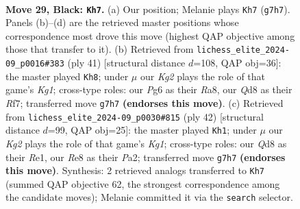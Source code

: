 \documentclass[11pt]{article}
\begin{document}
\clearpage

\begin{figure}[p]\centering
\begin{subfigure}{0.46\textwidth}\centering
\resizebox{\linewidth}{!}{%
\newchessgame
\chessboard[
  setfen={r2qr3/ppp3k1/3b1ppB/3b3p/PR6/2N3P1/RPP1QP1P/6K1 b - - 1 29},
  showmover=false,
  pgfstyle=straightmove, color=movearrow, markmove={g7-h7}
]}
\caption{}
\end{subfigure}\hfill
\begin{subfigure}{0.46\textwidth}\centering
\resizebox{\linewidth}{!}{%
\newchessgame
\chessboard[
  setfen={r2q2k1/p4r2/2p1b1Q1/3pp3/4Pb2/1PP4P/P2N1PP1/R3R1K1 b - - 1 21},
  showmover=false,
  pgfstyle=straightmove, color=movearrow, markmove={g8-h8}
]}
\caption{}
\end{subfigure}
\\[4pt]
\begin{subfigure}{0.46\textwidth}\centering
\resizebox{\linewidth}{!}{%
\newchessgame
\chessboard[
  setfen={r5k1/2pnrp1p/1p1p2p1/pB1P2B1/3bqP2/1P6/P2Q2PP/3RR1K1 w - - 2 22},
  showmover=false,
  pgfstyle=straightmove, color=movearrow, markmove={g1-h1}
]}
\caption{}
\end{subfigure}\hfill

\caption{\textbf{Move 29, Black: \texttt{Kh7}.} (a) Our position; Melanie plays \texttt{Kh7} (\texttt{g7h7}). Panels (b)--(d) are the retrieved master positions whose correspondence most drove this move (highest QAP objective among those that transfer to it). (b) Retrieved from \texttt{lichess\_elite\_2024-09\_p0016\#383} (ply 41) [structural distance $d$=108, QAP obj=36]: the master played \texttt{Kh8}; under $\mu$ our \emph{Kg2} plays the role of that game's \emph{Kg1}; cross-type roles: our \emph{P}g6 as their \emph{R}a8, our \emph{Q}d8 as their \emph{R}f7; transferred move \texttt{g7h7} \textbf{(endorses this move)}. (c) Retrieved from \texttt{lichess\_elite\_2024-09\_p0030\#815} (ply 42) [structural distance $d$=99, QAP obj=25]: the master played \texttt{Kh1}; under $\mu$ our \emph{Kg2} plays the role of that game's \emph{Kg1}; cross-type roles: our \emph{Q}d8 as their \emph{R}e1, our \emph{R}e8 as their \emph{P}a2; transferred move \texttt{g7h7} \textbf{(endorses this move)}. Synthesis: 2 retrieved analogs transferred to \texttt{Kh7} (summed QAP objective 62, the strongest correspondence among the candidate moves); Melanie committed it via the \texttt{search} selector.}
\label{fig:thought-m57}
\end{figure}
\end{document}
